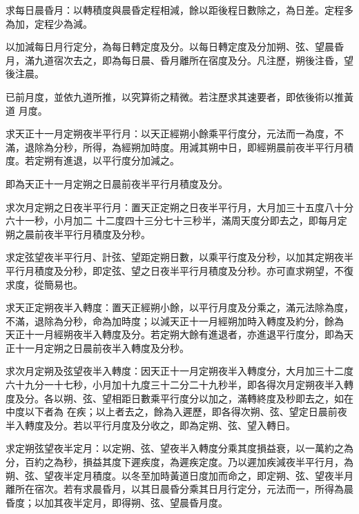 \begin{pinyinscope}
 求每日晨昏月：以轉積度與晨昏定程相減，餘以距後程日數除之，為日差。定程多為加，定程少為減。



 以加減每日月行定分，為每日轉定度及分。以每日轉定度及分加朔、弦、望晨昏月，滿九道宿次去之，即為每日晨、昏月離所在宿度及分。凡注歷，朔後注昏，望後注晨。



 已前月度，並依九道所推，以究算術之精微。若注歷求其速要者，即依後術以推黃道
 月度。



 求天正十一月定朔夜半平行月：以天正經朔小餘乘平行度分，元法而一為度，不滿，退除為分秒，所得，為經朔加時度。用減其朔中日，即經朔晨前夜半平行月積度。若定朔有進退，以平行度分加減之。



 即為天正十一月定朔之日晨前夜半平行月積度及分。



 求次月定朔之日夜半平行月：置天正定朔之日夜半平行月，大月加三十五度八十分六十一秒，小月加二
 十二度四十三分七十三秒半，滿周天度分即去之，即每月定朔之晨前夜半平行月積度及分秒。



 求定弦望夜半平行月、計弦、望距定朔日數，以乘平行度及分秒，以加其定朔夜半平行月積度及分秒，即定弦、望之日夜半平行月積度及分秒。亦可直求朔望，不復求度，從簡易也。



 求天正定朔夜半入轉度：置天正經朔小餘，以平行月度及分乘之，滿元法除為度，不滿，退除為分秒，命為加時度；以減天正十一月經朔加時入轉度及約分，餘為
 天正十一月經朔夜半入轉度及分。若定朔大餘有進退者，亦進退平行度分，即為天正十一月定朔之日晨前夜半入轉度及分秒。



 求次月定朔及弦望夜半入轉度：因天正十一月定朔夜半入轉度分，大月加三十二度六十九分一十七秒，小月加十九度三十二分二十九秒半，即各得次月定朔夜半入轉度及分。各以朔、弦、望相距日數乘平行度分以加之，滿轉終度及秒即去之，如在中度以下者為
 在疾；以上者去之，餘為入遲歷，即各得次朔、弦、望定日晨前夜半入轉度及分。若以平行月度及分收之，即為定朔、弦、望入轉日。



 求定朔弦望夜半定月：以定朔、弦、望夜半入轉度分乘其度損益衰，以一萬約之為分，百約之為秒，損益其度下遲疾度，為遲疾定度。乃以遲加疾減夜半平行月，為朔、弦、望夜半定月積度。以冬至加時黃道日度加而命之，即定朔、弦、望夜半月離所在宿次。若有求晨昏月，以其日晨昏分乘其日月行定分，元法而一，所得為晨昏度；以加其夜半定月，即得朔、弦、望晨昏月度。




\end{pinyinscope}
